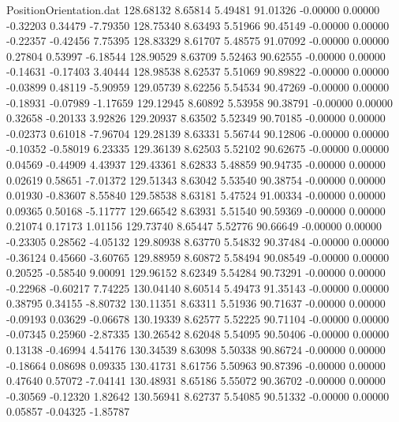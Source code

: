 \begin{filecontents}{PositionOrientation.dat}
 128.68132    8.65814    5.49481    91.01326   -0.00000    0.00000   -0.32203    0.34479   -7.79350
 128.75340    8.63493    5.51966    90.45149   -0.00000    0.00000   -0.22357   -0.42456    7.75395
 128.83329    8.61707    5.48575    91.07092   -0.00000    0.00000    0.27804    0.53997   -6.18544
 128.90529    8.63709    5.52463    90.62555   -0.00000    0.00000   -0.14631   -0.17403    3.40444
 128.98538    8.62537    5.51069    90.89822   -0.00000    0.00000   -0.03899    0.48119   -5.90959
 129.05739    8.62256    5.54534    90.47269   -0.00000    0.00000   -0.18931   -0.07989   -1.17659
 129.12945    8.60892    5.53958    90.38791   -0.00000    0.00000    0.32658   -0.20133    3.92826
 129.20937    8.63502    5.52349    90.70185   -0.00000    0.00000   -0.02373    0.61018   -7.96704
 129.28139    8.63331    5.56744    90.12806   -0.00000    0.00000   -0.10352   -0.58019    6.23335
 129.36139    8.62503    5.52102    90.62675   -0.00000    0.00000    0.04569   -0.44909    4.43937
 129.43361    8.62833    5.48859    90.94735   -0.00000    0.00000    0.02619    0.58651   -7.01372
 129.51343    8.63042    5.53540    90.38754   -0.00000    0.00000    0.01930   -0.83607    8.55840
 129.58538    8.63181    5.47524    91.00334   -0.00000    0.00000    0.09365    0.50168   -5.11777
 129.66542    8.63931    5.51540    90.59369   -0.00000    0.00000    0.21074    0.17173    1.01156
 129.73740    8.65447    5.52776    90.66649   -0.00000    0.00000   -0.23305    0.28562   -4.05132
 129.80938    8.63770    5.54832    90.37484   -0.00000    0.00000   -0.36124    0.45660   -3.60765
 129.88959    8.60872    5.58494    90.08549   -0.00000    0.00000    0.20525   -0.58540    9.00091
 129.96152    8.62349    5.54284    90.73291   -0.00000    0.00000   -0.22968   -0.60217    7.74225
 130.04140    8.60514    5.49473    91.35143   -0.00000    0.00000    0.38795    0.34155   -8.80732
 130.11351    8.63311    5.51936    90.71637   -0.00000    0.00000   -0.09193    0.03629   -0.06678
 130.19339    8.62577    5.52225    90.71104   -0.00000    0.00000   -0.07345    0.25960   -2.87335
 130.26542    8.62048    5.54095    90.50406   -0.00000    0.00000    0.13138   -0.46994    4.54176
 130.34539    8.63098    5.50338    90.86724   -0.00000    0.00000   -0.18664    0.08698    0.09335
 130.41731    8.61756    5.50963    90.87396   -0.00000    0.00000    0.47640    0.57072   -7.04141
 130.48931    8.65186    5.55072    90.36702   -0.00000    0.00000   -0.30569   -0.12320    1.82642
 130.56941    8.62737    5.54085    90.51332   -0.00000    0.00000    0.05857   -0.04325   -1.85787

\end{filecontents}
